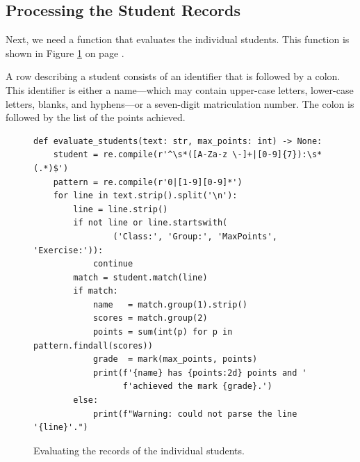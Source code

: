\subsection{Processing the Student Records}
Next, we need a function that evaluates the individual students.  This function is shown in Figure
\ref{fig:evaluate-students.py} on page \pageref{fig:evaluate-students.py}.

A row describing a student consists of an identifier that is followed by a colon.  This identifier is either a
name---which may contain upper-case letters, lower-case letters, blanks, and hyphens---or a seven-digit
matriculation number.  The colon is followed by the list of the points achieved.

\begin{figure}[!ht]
\centering
  \begin{verbatim}
def evaluate_students(text: str, max_points: int) -> None:
    student = re.compile(r'^\s*([A-Za-z \-]+|[0-9]{7}):\s*(.*)$')
    pattern = re.compile(r'0|[1-9][0-9]*')
    for line in text.strip().split('\n'):
        line = line.strip()
        if not line or line.startswith(
                ('Class:', 'Group:', 'MaxPoints', 'Exercise:')):
            continue
        match = student.match(line)
        if match:
            name   = match.group(1).strip()
            scores = match.group(2)
            points = sum(int(p) for p in pattern.findall(scores))
            grade  = mark(max_points, points)
            print(f'{name} has {points:2d} points and '
                  f'achieved the mark {grade}.')
        else:
            print(f"Warning: could not parse the line '{line}'.")
\end{verbatim}
\vspace*{-0.3cm}
\caption{Evaluating the records of the individual students.}
\label{fig:evaluate-students.py}
\end{figure}

